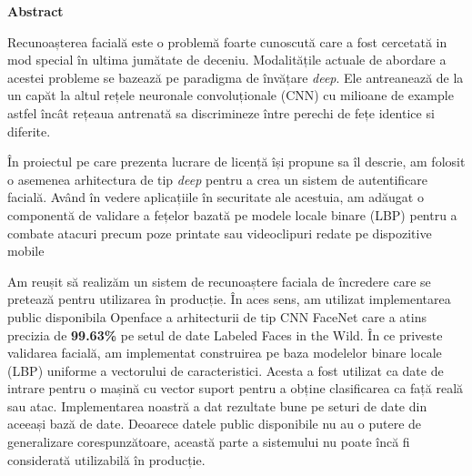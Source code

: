 \thispagestyle{plain}
\setlength{\parskip}{1.5em}

\vspace*{\fill}

\begin{center}
	\Large \textbf{Abstract}	
\end{center}

Recunoașterea facială este o problemă foarte cunoscută care a fost cercetată in mod special în ultima jumătate de deceniu. Modalitățile actuale de abordare a acestei probleme se bazează pe paradigma de învățare \textit{deep}. Ele antreanează de la un capăt la altul rețele neuronale convoluționale (CNN) cu milioane de example astfel încât rețeaua antrenată sa discrimineze între perechi de fețe identice si diferite.

În proiectul pe care prezenta lucrare de licență își propune sa îl descrie, am folosit o asemenea arhitectura de tip \textit{deep} pentru a crea un sistem de autentificare facială. Având în vedere aplicațiile în securitate ale acestuia, am adăugat o componentă de validare a fețelor bazată pe modele locale binare (LBP) pentru a combate atacuri precum poze printate sau videoclipuri redate pe dispozitive mobile

Am reușit să realizăm un sistem de recunoaștere faciala de încredere care se pretează pentru utilizarea în producție. În aces sens, am utilizat implementarea public disponibila Openface \cite{amos2016openface} a arhitecturii de tip CNN FaceNet \cite{SchroffKP15} care a atins precizia de \textbf{99.63\%} pe setul de date Labeled Faces in the Wild. 
În ce priveste validarea facială, am implementat construirea pe baza modelelor binare locale (LBP) uniforme a vectorului de caracteristici. Acesta a fost utilizat ca date de intrare pentru o mașină cu vector suport pentru a obține clasificarea ca față reală sau atac. Implementarea noastră a dat rezultate bune pe seturi de date din aceeași bază de date. Deoarece datele public disponibile nu au o putere de generalizare corespunzătoare, această parte a sistemului nu poate încă fi considerată utilizabilă în producție.

\vspace*{\fill}

